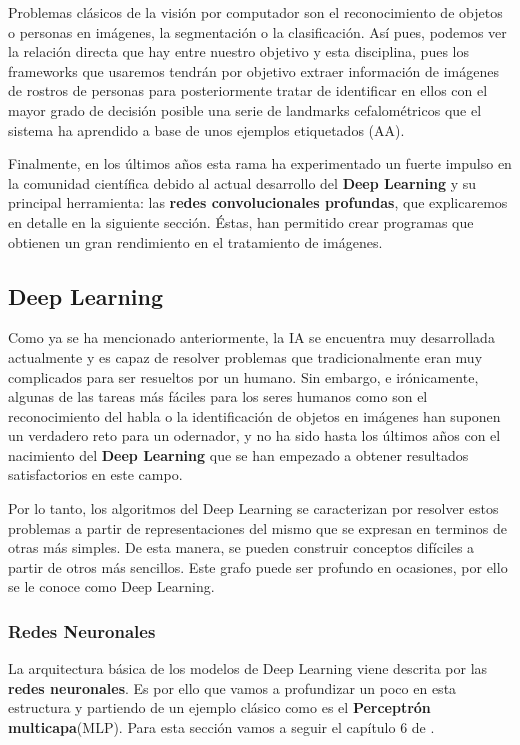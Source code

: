         \medskip
        
        \noindent Problemas clásicos de la visión por computador son el reconocimiento de objetos o personas en imágenes, la segmentación o la clasificación. Así pues, podemos ver la relación directa que hay entre nuestro objetivo y esta disciplina, pues los frameworks que usaremos tendrán por objetivo extraer información de imágenes de rostros de personas para posteriormente tratar de identificar en ellos con el mayor grado de decisión posible una serie de landmarks cefalométricos que el sistema ha aprendido a base de unos ejemplos etiquetados (AA).

        \medskip

        \noindent Finalmente, en los últimos años esta rama ha experimentado un fuerte impulso en la comunidad científica debido al actual desarrollo del \textbf{Deep Learning} y su principal herramienta: las \textbf{redes convolucionales profundas}, que explicaremos en detalle en la siguiente sección. Éstas, han permitido crear programas que obtienen un gran rendimiento en el tratamiento de imágenes.

    \subsection{Deep Learning}
        Como ya se ha mencionado anteriormente, la IA se encuentra muy desarrollada actualmente y es capaz de resolver problemas que tradicionalmente eran muy complicados para ser resueltos por un humano. Sin embargo, e irónicamente, algunas de las tareas más fáciles para los seres humanos como son el reconocimiento del habla o la identificación de objetos en imágenes han suponen un verdadero reto para un odernador, y no ha sido hasta los últimos años con el nacimiento del \textbf{Deep Learning} que se han empezado a obtener resultados satisfactorios en este campo.

        \medskip
        
        \noindent Por lo tanto, los algoritmos del Deep Learning se caracterizan por resolver estos problemas a partir de representaciones del mismo que se expresan en terminos de otras más simples. De esta manera, se pueden construir conceptos difíciles a partir de otros más sencillos. Este grafo puede ser profundo en ocasiones, por ello se le conoce como Deep Learning.

        \subsubsection{Redes Neuronales} \label{sub:redes_neuronales}
            La arquitectura básica de los modelos de Deep Learning viene descrita por las \textbf{redes neuronales}. Es por ello que vamos a profundizar un poco en esta estructura y partiendo de un ejemplo clásico como es el \textbf{Perceptrón multicapa}(MLP). Para esta sección vamos a seguir el capítulo 6 de \cite{Goodfellow-et-al-2016}.

